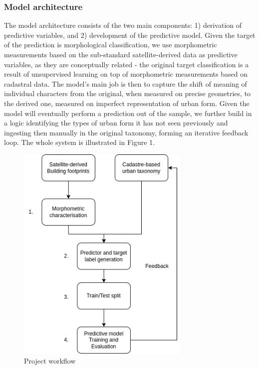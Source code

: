 \documentclass[
  letterpaper,
  DIV=11,
  numbers=noendperiod]{scrartcl}
\begin{document}
\subsubsection{Model architecture}\label{model-architecture}

The model architecture consists of the two main components: 1)
derivation of predictive variables, and 2) development of the predictive
model. Given the target of the prediction is morphological
classification, we use morphometric measurements based on the
sub-standard satellite-derived data as predictive variables, as they are
conceptually related - the original target classification is a result of
unsupervised learning on top of morphometric measurements based on
cadastral data. The model's main job is then to capture the shift of
meaning of individual characters from the original, when measured on
precise geometries, to the derived one, measured on imperfect
representation of urban form. Given the model will eventually perform a
prediction out of the sample, we further build in a logic identifying
the types of urban form it has not seen previously and ingesting then
manually in the original taxonomy, forming an iterative feedback loop.
The whole system is illustrated in Figure 1.

\begin{figure}[H]

{\centering \includegraphics[width=\linewidth,height=4.16667in,keepaspectratio]{../figures/algo_design/workflow.png}

}

\caption{Project workflow}

\end{figure}%
\end{document}
